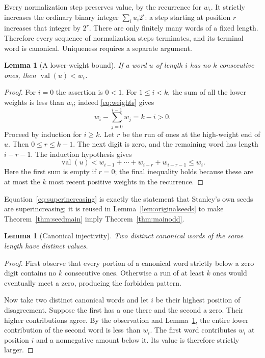 \documentclass[11pt,letterpaper]{article}
\numberwithin{equation}{section}
\newtheorem{lemma}[theorem]{Lemma}
\theoremstyle{definition}
\theoremstyle{remark}
\newcommand{\val}{\operatorname{val}}
\begin{document}
Every normalization step preserves value, by the recurrence for $w_i$.
It strictly increases the ordinary binary integer $\sum_i u_i2^i$:
a step starting at position $r$ increases that integer by $2^r$.
There are only finitely many words of a fixed length. Therefore every
sequence of normalization steps terminates, and its terminal word is
canonical. Uniqueness requires a separate argument.

\begin{lemma}[A lower-weight bound]
\label{lem:lower}
If a word $u$ of length $i$ has no $k$ consecutive ones, then
$\val(u)<w_i$.
\end{lemma}
\begin{proof}
For $i=0$ the assertion is $0<1$. For $1\le i<k$, the sum of all the lower
weights is less than $w_i$; indeed \eqref{eq:weights} gives
\begin{equation}
 w_i-\sum_{j=0}^{i-1}w_j=k-i>0.
 \label{eq:superincreasing}
\end{equation}
Proceed by induction for $i\ge k$. Let $r$ be the run of ones at the
high-weight end of $u$. Then $0\le r\le k-1$. The next digit is zero,
and the remaining word has length $i-r-1$. The induction hypothesis gives
\[
 \val(u)<w_{i-1}+\cdots+w_{i-r}+w_{i-r-1}\le w_i.
\]
Here the first sum is empty if $r=0$; the final inequality holds because
these are at most the $k$ most recent positive weights in the recurrence.
\end{proof}

Equation~\eqref{eq:superincreasing} is exactly the statement that Stanley's
own seeds are superincreasing; it is reused in
Lemma~\ref{lem:originalseeds} to make Theorem~\ref{thm:seedmain} imply
Theorem~\ref{thm:mainodd}.

\begin{lemma}[Canonical injectivity]
\label{lem:injective}
Two distinct canonical words of the same length have distinct values.
\end{lemma}
\begin{proof}
First observe that every portion of a canonical word strictly below a
zero digit contains no $k$ consecutive ones. Otherwise a run of at least
$k$ ones would eventually meet a zero, producing the forbidden pattern.

Now take two distinct canonical words and let $i$ be their highest
position of disagreement. Suppose the first has a one there and the
second a zero. Their higher contributions agree. By the observation and
Lemma~\ref{lem:lower}, the entire lower contribution of the second word is
less than $w_i$. The first word contributes $w_i$ at position $i$ and a
nonnegative amount below it. Its value is therefore strictly larger.
\end{proof}
\end{document}
